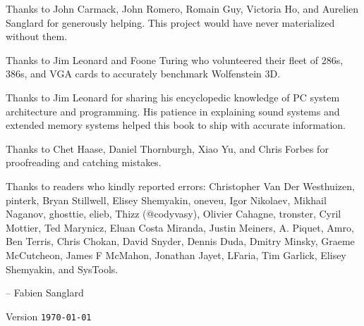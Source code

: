 Thanks to John Carmack, John Romero, Romain Guy, Victoria Ho, and Aurelien Sanglard for generously helping. This project would have never
materialized without them.\\ 
\par
Thanks to  Jim Leonard and Foone Turing who volunteered their fleet of 286s, 386s, and VGA cards to accurately benchmark Wolfenstein 3D.\\
\par
Thanks to  Jim Leonard for sharing his encyclopedic knowledge of PC system architecture and programming. His patience in explaining sound systems and extended memory systems helped this book to ship with accurate information.\\
\par
Thanks to  Chet Haase, Daniel Thornburgh, Xiao Yu, and Chris Forbes for proofreading and catching mistakes.\\
\par
Thanks to readers who kindly reported errors: Christopher Van Der Westhuizen, pinterk, Bryan Stillwell, Elisey Shemyakin, oneveu, Igor Nikolaev, Mikhail Naganov, ghosttie, elieb, Thizz (@codyvasy), Olivier Cahagne, tronster, Cyril Mottier, Ted Marynicz, Eluan Costa Miranda, Justin Meiners, A. Piquet, Amro, Ben Terris, Chris Chokan, David Snyder, Dennis Duda, Dmitry Minsky, Graeme McCutcheon, James F McMahon, Jonathan Jayet, LFaria, Tim Garlick, Elisey Shemyakin, and SysTools.\\
\par
-- Fabien Sanglard\\
\par
 Version \texttt{\monthyeardate\today}


\thispagestyle{plain} %
